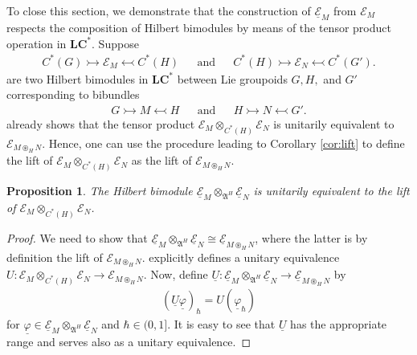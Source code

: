 \documentclass[sn-mathphys,Numbered]{sn-jnl}
\newtheorem{proposition}[theorem]{Proposition}%
\begin{document}
To close this section, we demonstrate that the construction of $\underline{{\mathcal{E}}}_M$ from $\mathcal{E}_M$ respects the composition of Hilbert bimodules by means of the tensor product operation in $\mathbf{LC^*}$.  Suppose \begin{align}
    C^*(G)\rightarrowtail\mathcal{E}_M\leftarrowtail C^*(H) && \text{and} && C^*(H)\rightarrowtail\mathcal{E}_N\leftarrowtail C^*(G').
    \end{align}
    are two Hilbert bimodules in $\mathbf{LC^*}$ between Lie groupoids $G, H,$ and $G'$ corresponding to bibundles
    \begin{align}
        G\rightarrowtail M\leftarrowtail H && \text{and} && H\rightarrowtail N\leftarrowtail G'.
    \end{align}
\citet{La01a} already shows that the tensor product $\mathcal{E}_M\otimes_{C^*(H)}\mathcal{E}_N$ is unitarily equivalent to $\mathcal{E}_{M\circledast_H N}$. 
 Hence, one can use the procedure leading to Corollary \ref{cor:lift} to define the lift of $\mathcal{E}_M\otimes_{C^*(H)}\mathcal{E}_N$ as the lift of $\mathcal{E}_{M\circledast_H N}$.\bigskip

\begin{proposition}
    
The Hilbert bimodule $\underline{\mathcal{E}}_M\otimes_{\mathfrak{A}^H}\underline{\mathcal{E}}_N$ is unitarily equivalent to the lift of $\mathcal{E}_M\otimes_{C^*(H)}\mathcal{E}_N$.
\end{proposition}

\begin{proof}
    We need to show that $ \underline{\mathcal{E}}_M\otimes_{\mathfrak{A}^H}\underline{\mathcal{E}}_N\cong \underline{\mathcal{E}}_{M\circledast_H N}$, where the latter is by definition the lift of $\mathcal{E}_{M\circledast_H N}$.  \citet[][Eq. 3.8, p. 107]{La01a} explicitly defines a unitary equivalence $U: \mathcal{E}_M\otimes_{C^*(H)}\mathcal{E}_N\to \mathcal{E}_{M\circledast_H N}$.  Now, define $\underline{U}: \underline{\mathcal{E}}_M\otimes_{\mathfrak{A}^H}\underline{\mathcal{E}}_N\to \underline{\mathcal{E}}_{M\circledast_H N}$ by
    \begin{align}
        (\underline{U}\underline{\varphi})_\hbar = U(\underline{\varphi}_\hbar)
    \end{align}
    for $\underline{\varphi}\in \underline{\mathcal{E}}_M\otimes_{\mathfrak{A}^H}\underline{\mathcal{E}}_N$ and $\hbar\in (0,1]$.  It is easy to see that $\underline{U}$ has the appropriate range and serves also as a unitary equivalence.
\end{proof}
\end{document}
